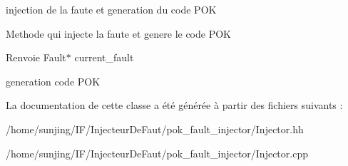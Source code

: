 injection de la faute et generation du code POK 

Methode qui injecte la faute et genere le code POK

\begin{DoxyReturn}{Renvoie}
Fault$\ast$ current\_\-fault 
\end{DoxyReturn}


generation code POK 



La documentation de cette classe a été générée à partir des fichiers suivants :\begin{DoxyCompactItemize}
\item 
/home/sunjing/IF/InjecteurDeFaut/pok\_\-fault\_\-injector/Injector.hh\item 
/home/sunjing/IF/InjecteurDeFaut/pok\_\-fault\_\-injector/Injector.cpp\end{DoxyCompactItemize}
